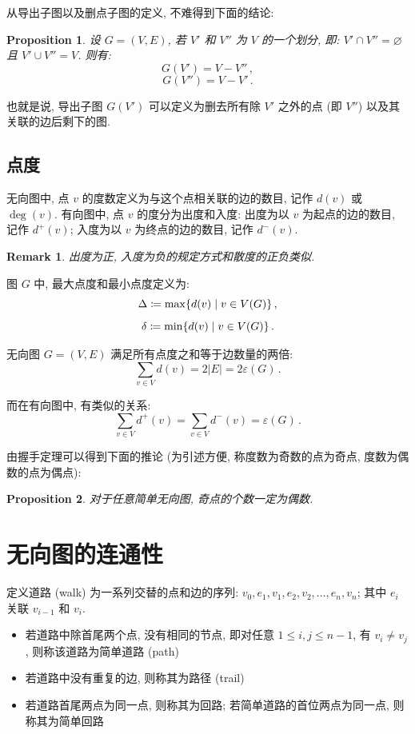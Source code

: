 \documentclass[UTF8]{ctexart}
\theoremstyle{mystyle}
\newtheorem{proposition}{Proposition}[section]
\theoremstyle{myremark}
\newtheorem*{remark}{Remark}
\theoremstyle{plain}
\DeclarePairedDelimiter\set{\{}{\}}
\begin{document}
从导出子图以及删点子图的定义, 不难得到下面的结论:
\begin{proposition}
    设 $ G = (V, E) $, 若 $ V' $ 和 $ V'' $ 为 $ V $ 的一个划分, 即: $ V' \cap V'' = \varnothing $ 且 $ V' \cup V'' = V $. 则有:
    \[ G(V') = V - V'' \,,\]
    \[ G(V'') = V - V' \,.\]
\end{proposition}

也就是说, 导出子图 $ G(V') $ 可以定义为删去所有除 $ V' $ 之外的点 (即 $ V'' $) 以及其关联的边后剩下的图.

\subsection{点度}
\begin{definition}[\text{度}]
    无向图中, 点 $ v $ 的度数定义为与这个点相关联的边的数目, 记作 $ d(v) $ 或 $ \deg(v) $. 有向图中, 点 $ v $ 的度分为出度和入度: 出度为以 $ v $ 为起点的边的数目, 记作 $ d^+(v) $; 入度为以 $ v $ 为终点的边的数目, 记作 $ d^-(v) $.
\end{definition}

\begin{remark}
    出度为正, 入度为负的规定方式和散度的正负类似.
\end{remark}

图 $ G $ 中, 最大点度和最小点度定义为:
\[ \Delta \coloneqq \max \set{d(v) \mid v \in V(G)} \,,\]
\[ \delta \coloneqq \min \set{d(v) \mid v \in V(G)} \,.\]

\begin{theorem}
    无向图 $ G = (V, E) $ 满足所有点度之和等于边数量的两倍:
    \[ \sum_{v \in V} d (v) = 2 |E| = 2 \varepsilon(G) \,.\]

    而在有向图中, 有类似的关系:
    \[ \sum_{v \in V} d^+(v) = \sum_{v \in V} d^-(v) =  \varepsilon(G) \,.\]
\end{theorem}

由握手定理可以得到下面的推论 (为引述方便, 称度数为奇数的点为奇点, 度数为偶数的点为偶点):
\begin{proposition}
    对于任意简单无向图, 奇点的个数一定为偶数.
\end{proposition}



\section{无向图的连通性}
\begin{definition}
    定义道路 (walk) 为一系列交替的点和边的序列: $ v_0, e_1, v_1, e_2, v_2, \dots, e_n, v_n $; 其中 $ e_i $ 关联 $ v_{i - 1} $ 和 $ v_i $. 
    \begin{itemize}
        \item 若道路中除首尾两个点, 没有相同的节点, 即对任意 $ 1 \leqslant i, j \leqslant n - 1 $, 有 $ v_i \neq v_j $, 则称该道路为简单道路 (path)
        \item 若道路中没有重复的边, 则称其为路径 (trail)
        \item 若道路首尾两点为同一点, 则称其为回路; 若简单道路的首位两点为同一点, 则称其为简单回路
    \end{itemize}
\end{definition}
\end{document}
